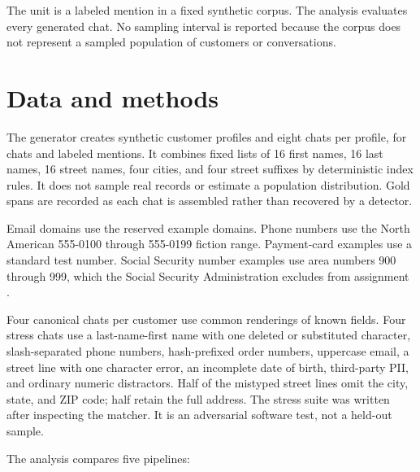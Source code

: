 \documentclass[11pt]{article}
\begin{document}
The unit is a labeled mention in a fixed synthetic corpus. The analysis
evaluates every generated chat. No sampling interval is reported because the
corpus does not represent a sampled population of customers or conversations.

\section*{Data and methods}

The generator creates \ProfileCount{} synthetic customer profiles and eight
chats per profile, for \ChatCount{} chats and \MentionCount{} labeled mentions.
It combines fixed lists of 16 first names, 16 last names, 16 street names, four
cities, and four street suffixes by deterministic index rules. It does not
sample real records or estimate a population distribution. Gold spans are
recorded as each chat is assembled rather than recovered by a detector.

Email domains use the reserved example domains. Phone numbers use the North
American 555-0100 through 555-0199 fiction range. Payment-card examples use a
standard test number. Social Security number examples use area numbers 900
through 999, which the Social Security Administration excludes from assignment
\citep{ssaRandomization}.

Four canonical chats per customer use common renderings of known fields. Four
stress chats use a last-name-first name with one deleted or substituted
character, slash-separated phone numbers, hash-prefixed order numbers,
uppercase email, a street line with one character error, an incomplete date of
birth, third-party PII, and ordinary numeric distractors. Half of the mistyped
street lines omit the city, state, and ZIP code; half retain the full address.
The stress suite was written after inspecting the matcher. It is an adversarial
software test, not a held-out sample.

The analysis compares five pipelines:
\end{document}
